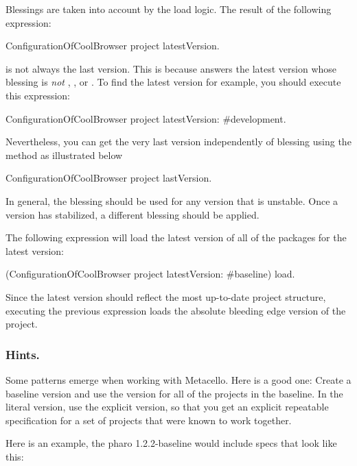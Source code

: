 \documentclass[a4paper,10pt,twoside]{book}
\begin{document}
Blessings are taken into account by the load logic. The result of the following expression:
\begin{code}{}
ConfigurationOfCoolBrowser project latestVersion.
\end{code}
is not always the last version.  This is because  answers the latest version whose blessing is {\em not} , , or . To find the latest  version for example, you should execute this expression:

\begin{code}{}
ConfigurationOfCoolBrowser project latestVersion: #development.
\end{code}

Nevertheless, you can get the very last version independently of blessing using the  method as illustrated below

\begin{code}{}
ConfigurationOfCoolBrowser project lastVersion.
\end{code}

In general, the  blessing should be used for any version that is unstable. Once a version has stabilized, a different blessing should be applied.

The following expression will load the latest version of all of the packages for the latest  version:
 \begin{code}{}
(ConfigurationOfCoolBrowser project latestVersion: #baseline) load.
\end{code}

Since the latest  version should reflect the most up-to-date project structure, executing the previous expression loads the absolute bleeding edge version of the project. 


\subsubsection{Hints.}
Some patterns emerge when working with Metacello. Here is a good one: 
Create a baseline version and use the  version for all of the projects in the baseline. In the literal version, use the explicit version, so that you get an explicit repeatable specification for a set of projects that were known to work together.

Here is an example, the pharo 1.2.2-baseline would include specs that look like this:
\end{document}
